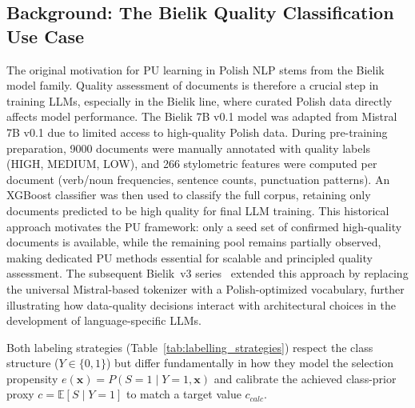 \documentclass[applsci,article,accept,pdftex,moreauthors]{Definitions/mdpi}
\newcommand{\rev}[1]{{#1}}
\begin{document}
\subsection{Background: The Bielik Quality Classification Use Case}

\rev{The original motivation for PU learning in Polish NLP stems from the Bielik model family. Quality assessment of documents is therefore a crucial step in training LLMs, especially in the Bielik line, where curated Polish data directly affects model performance. The Bielik 7B v0.1 model was adapted from Mistral 7B v0.1 due to limited access to high-quality Polish data. During pre-training preparation, 9000 documents were manually annotated with quality labels (HIGH, MEDIUM, LOW), and 266 stylometric features were computed per document (verb/noun frequencies, sentence counts, punctuation patterns). An XGBoost classifier was then used to classify the full corpus, retaining only documents predicted to be high quality for final LLM training. This historical approach motivates the PU framework: only a seed set of confirmed high-quality documents is available, while the remaining pool remains partially observed, making dedicated PU methods essential for scalable and principled quality assessment. The subsequent Bielik~v3 series~\cite{ociepa2026bielikv3tok} extended this approach by replacing the universal Mistral-based tokenizer with a Polish-optimized vocabulary, further illustrating how data-quality decisions interact with architectural choices in the development of language-specific LLMs.}

Both labeling strategies (Table~\ref{tab:labelling_strategies}) respect the class structure ($Y \in \{0, 1\}$) but differ fundamentally in how they model the selection propensity $e(\mathbf{x}) = P(S=1 \mid Y=1, \mathbf{x})$ and calibrate the achieved class-prior proxy $c = \mathbb{E}[S \mid Y=1]$ to match a target value $c_{calc}$.
\end{document}
